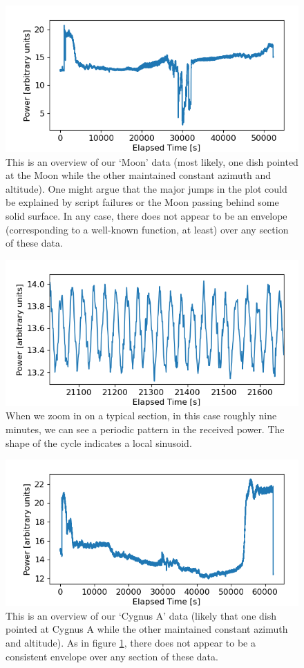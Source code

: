 \documentclass[12pt]{article}
\begin{document}
\begin{figure}
	\centering
	\includegraphics[width=.6\linewidth]{envelope/Moon}
	\caption{This is an overview of our `Moon' data (most likely, one dish pointed at the Moon while the other maintained constant azimuth and altitude). One might argue that the major jumps in the plot could be explained by script failures or the Moon passing behind some solid surface. In any case, there does not appear to be an envelope (corresponding to a well-known function, at least) over any section of these data.}
	\label{fig:Moon_envelope}
\end{figure}

\begin{figure}
	\centering
	\includegraphics[width=.6\linewidth]{sinusoid/Moon}
	\caption{When we zoom in on a typical section, in this case roughly nine minutes, we can see a periodic pattern in the received power. The shape of the cycle indicates a local sinusoid.}
	\label{fig:Moon_sinusoid}
\end{figure}

\begin{figure}
	\centering
	\includegraphics[width=.6\linewidth]{envelope/CygnusA}
	\caption{This is an overview of our `Cygnus A' data (likely that one dish pointed at Cygnus A while the other maintained constant azimuth and altitude). As in figure \ref{fig:Moon_envelope}, there does not appear to be a consistent envelope over any section of these data.}
	\label{fig:Cyg_envelope}
\end{figure}
\end{document}

